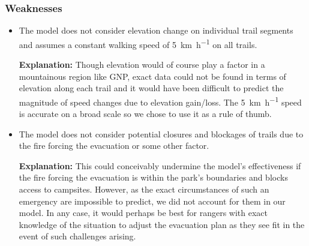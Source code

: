 \documentclass[12pt]{article}
\begin{document}
\subsubsection{Weaknesses}
\begin{itemize}
    \item The model does not consider elevation change on individual trail segments and assumes a constant walking speed of \SI{5}{\kilo\meter\per\hour} on all trails. 
    
    \textbf{Explanation:} Though elevation would of course play a factor in a mountainous region like GNP, exact data could not be found in terms of elevation along each trail and it would have been difficult to predict the magnitude of speed changes due to elevation gain/loss. The \SI{5}{\kilo\meter\per\hour} speed is accurate on a broad scale so we chose to use it as a rule of thumb.
    
    \item The model does not consider potential closures and blockages of trails due to the fire forcing the evacuation or some other factor.
    
    \textbf{Explanation:} This could conceivably undermine the model's effectiveness if the fire forcing the evacuation is within the park's boundaries and blocks access to campsites. However, as the exact circumstances of such an emergency are impossible to predict, we did not account for them in our model. In any case, it would perhaps be best for rangers with exact knowledge of the situation to adjust the evacuation plan as they see fit in the event of such challenges arising.
\end{itemize}
\end{document}
